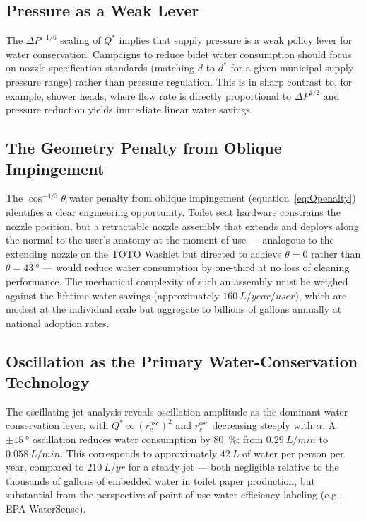 \documentclass[aps,prfluids,reprint,amsmath,amssymb,floatfix]{revtex4-2}
\begin{document}
\subsection{Pressure as a Weak Lever}
\label{subsec:disc_pressure}

The $\Delta P^{-1/6}$ scaling of $Q^*$ implies that supply pressure is
a weak policy lever for water conservation. Campaigns to reduce bidet
water consumption should focus on nozzle specification standards (matching
$d$ to $d^*$ for a given municipal supply pressure range) rather than
pressure regulation. This is in sharp contrast to, for example, shower
heads, where flow rate is directly proportional to $\Delta P^{1/2}$ and
pressure reduction yields immediate linear water savings.

\subsection{The Geometry Penalty from Oblique Impingement}
\label{subsec:disc_oblique}

The $\cos^{-4/3}\theta$ water penalty from oblique impingement
(equation~\eqref{eq:Qpenalty}) identifies a clear engineering opportunity.
Toilet seat hardware constrains the nozzle position, but a retractable
nozzle assembly that extends and deploys along the normal to the user's
anatomy at the moment of use --- analogous to the extending nozzle on
the TOTO Washlet but directed to achieve $\theta = 0$ rather than
$\theta = \SI{43}{\degree}$ --- would reduce water consumption by
one-third at no loss of cleaning performance. The mechanical complexity
of such an assembly must be weighed against the lifetime water savings
(approximately $\SI{160}{L\per year\per user}$), which are modest at the
individual scale but aggregate to billions of gallons annually at
national adoption rates.

\subsection{Oscillation as the Primary Water-Conservation Technology}
\label{subsec:disc_osc}

The oscillating jet analysis reveals oscillation amplitude as the dominant
water-conservation lever, with $Q^* \propto (r_c^\mathrm{osc})^2$
and $r_c^\mathrm{osc}$ decreasing steeply with $\alpha$. A $\pm\SI{15}{\degree}$
oscillation reduces water consumption by \SI{80}{\percent}: from
$\SI{0.29}{L/min}$ to $\SI{0.058}{L/min}$. This corresponds to
approximately $\SI{42}{L}$ of water per person per year, compared to
$\SI{210}{L/yr}$ for a steady jet --- both negligible relative to the
thousands of gallons of embedded water in toilet paper production, but
substantial from the perspective of point-of-use water efficiency labeling
(e.g., EPA WaterSense).
\end{document}
